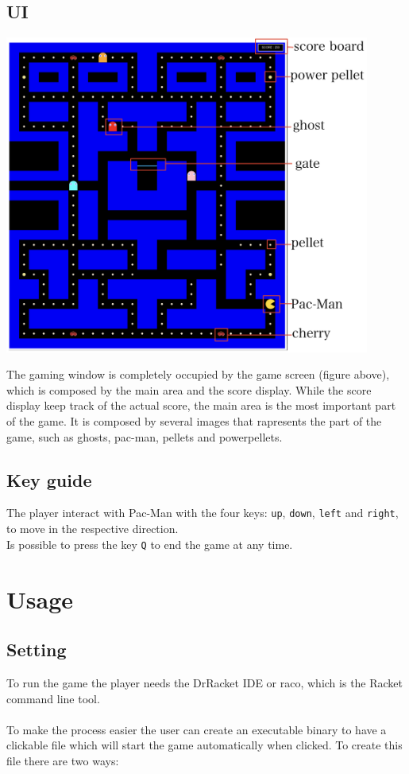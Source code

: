 \documentclass{article}
\begin{document}
\subsection{UI}
\begin{center}
\includegraphics[width=12cm]{./images/user_interface.png}
\end{center}
The gaming window is completely occupied by the game screen (figure above), which is composed by the main area and the score display. While the score display keep track of the actual score, the main area is the most important part of the game. It is composed by several images that rapresents the part of the game, such as ghosts, pac-man, pellets and powerpellets.
 
\subsection{Key guide}
The player interact with Pac-Man with the four keys: \texttt{up}, \texttt{down}, \texttt{left} and \texttt{right}, to move in the respective direction.
\\
Is possible to press the key \texttt{Q} to end the game at any time.
 
\section{Usage}
  
\subsection{Setting}\label{setting}
To run the game the player needs the DrRacket IDE or raco, which is the Racket command line tool.\\
\\
To make the process easier the user can create an executable binary to have a clickable file which will start the game automatically when clicked. To create this file there are two ways:
\end{document}

